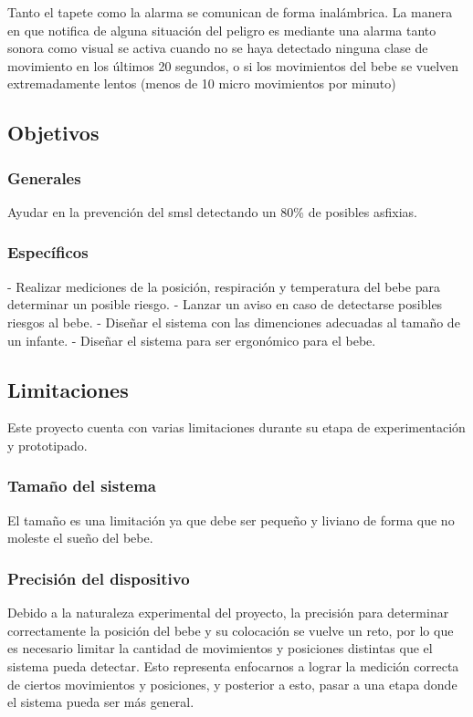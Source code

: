 Tanto el tapete como la alarma se comunican de forma inalámbrica.
La manera en que notifica de alguna situación del peligro es mediante una alarma tanto sonora como visual se activa cuando no se haya detectado ninguna clase de movimiento en los últimos 20 segundos, o si los movimientos del bebe se vuelven extremadamente lentos (menos de 10 micro movimientos por minuto)

\subsection{Objetivos}

\subsubsection{Generales}

Ayudar en la prevención del \acrlong{smsl} detectando un 80\% de posibles asfixias.

\subsubsection{Específicos}

- Realizar mediciones de la posición, respiración y temperatura del bebe para determinar un posible riesgo.
- Lanzar un aviso en caso de detectarse posibles riesgos al bebe.
- Diseñar el sistema con las dimenciones adecuadas al tamaño de un infante.
- Diseñar el sistema para ser ergonómico para el bebe.

\subsection{Limitaciones}

Este proyecto cuenta con varias limitaciones durante su etapa de experimentación y prototipado.

\subsubsection{Tamaño del sistema}

El tamaño es una limitación ya que debe ser pequeño y liviano de forma que no moleste el sueño del bebe.

\subsubsection{Precisión del dispositivo}

Debido a la naturaleza experimental del proyecto, la precisión para determinar correctamente la posición del bebe y su colocación se vuelve un reto, por lo que es necesario limitar la cantidad de movimientos y posiciones distintas que el sistema pueda detectar.
Esto representa enfocarnos a lograr la medición correcta de ciertos movimientos y posiciones, y posterior a esto, pasar a una etapa donde el sistema pueda ser más general. 

